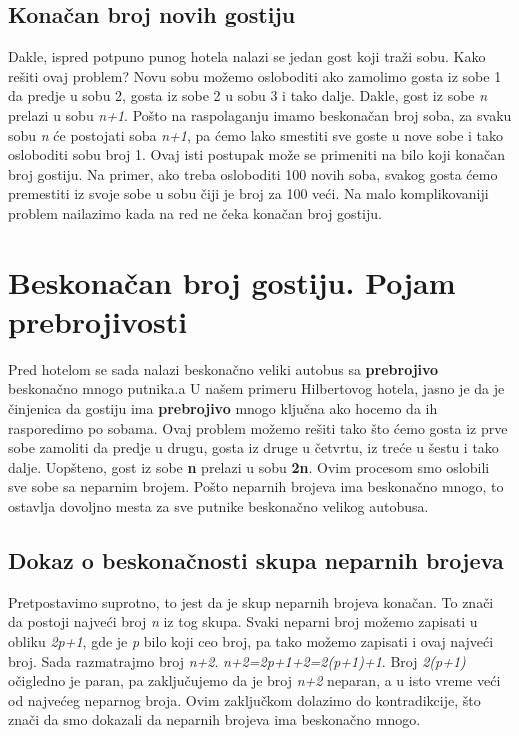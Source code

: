 \documentclass[a4paper]{article}
\begin{document}
\subsection{Konačan broj novih gostiju}
Dakle, ispred potpuno punog hotela nalazi se jedan gost koji traži sobu. Kako rešiti ovaj problem?
Novu sobu možemo osloboditi ako zamolimo gosta iz sobe 1 da predje u sobu 2, gosta iz sobe 2 u sobu 3 i tako dalje. Dakle, gost iz sobe \textit{n} prelazi u sobu \textit{n+1}.
Pošto na raspolaganju imamo beskonačan broj soba, za svaku sobu \textit{n} će postojati soba \textit{n+1}, pa ćemo lako smestiti sve goste u nove sobe i tako osloboditi sobu broj 1.
Ovaj isti postupak može se primeniti na bilo koji konačan broj gostiju. Na primer, ako treba osloboditi 100 novih soba, svakog gosta ćemo premestiti iz svoje sobe u sobu čiji je broj za 100 veći.
Na malo komplikovaniji problem nailazimo kada na red ne čeka konačan broj gostiju.

\newpage
\section{Beskonačan broj gostiju. Pojam prebrojivosti}
\label{sec:beskonačan broj gostiju}
Pred hotelom se sada nalazi beskonačno veliki autobus sa \textbf {prebrojivo} beskonačno mnogo putnika.a
U našem primeru Hilbertovog hotela, jasno je da je činjenica da gostiju ima \textbf {prebrojivo} mnogo ključna ako hocemo da ih rasporedimo po sobama.
Ovaj problem možemo rešiti tako što ćemo gosta iz prve sobe zamoliti da predje u drugu, gosta iz druge u četvrtu, iz treće u šestu i tako dalje.
Uopšteno, gost iz sobe \textbf {n} prelazi u sobu \textbf {2n}. Ovim procesom smo oslobili sve sobe sa neparnim brojem.
Pošto neparnih brojeva ima beskonačno mnogo, to ostavlja dovoljno mesta za sve putnike beskonačno velikog autobusa.

\subsection {Dokaz o beskonačnosti skupa neparnih brojeva}
Pretpostavimo suprotno, to jest da je skup neparnih brojeva konačan.
To znači da postoji najveći broj \textit{n} iz tog skupa.
Svaki neparni broj možemo zapisati u obliku \textit{2p+1}, gde je \textit{p} bilo koji ceo broj, pa tako možemo zapisati i ovaj najveći broj.
Sada razmatrajmo broj \textit{n+2}. \textit{n+2=2p+1+2=2(p+1)+1}.
Broj \textit{2(p+1)} očigledno je paran, pa zaključujemo da je broj \textit{n+2} neparan, a u isto vreme veći od najvećeg neparnog broja.
Ovim zaključkom dolazimo do kontradikcije, što znači da smo dokazali da neparnih brojeva ima beskonačno mnogo.
\end{document}
